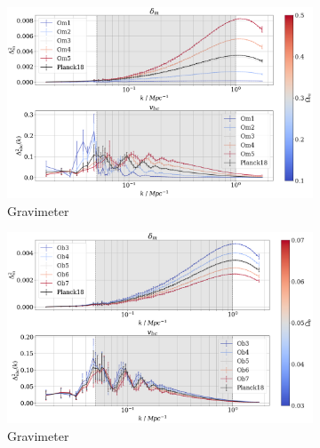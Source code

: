 \documentclass[floats,floatfix,showpacs,amssymb,prd,superscriptaddress,nofootinbib]{revtex4-2} %
\begin{document}
\begin{figure}[H]
     \centering
     \begin{subfigure}[b]{0.9\textwidth}
         \centering
         \includegraphics[width=\textwidth]{images/ic_power_spectra/compare_cosmologies_averaged_power_spectra_Om.png}
         \caption{Gravimeter}
         \label{fig:averaged_IC_power_spectra_Om}
     \end{subfigure}
     \hfill
     \begin{subfigure}[b]{0.9\textwidth}
         \centering
         \includegraphics[width=\textwidth]{images/ic_power_spectra/compare_cosmologies_averaged_power_spectra_Ob.png}
         \caption{Gravimeter}
         \label{fig:averaged_IC_power_spectra_Ob}
     \end{subfigure}
     \hfill
     \begin{subfigure}[b]{0.9\textwidth}
         \centering

\end{subfigure}
\end{figure}
\end{document}
